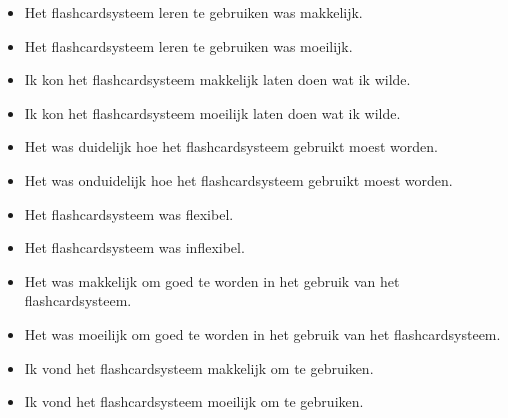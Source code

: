 \begin{itemize}
\itemsep1pt\parskip0pt
\item
  Het flashcardsysteem leren te gebruiken was makkelijk.
\item
  Het flashcardsysteem leren te gebruiken was moeilijk.
\item
  Ik kon het flashcardsysteem makkelijk laten doen wat ik wilde.
\item
  Ik kon het flashcardsysteem moeilijk laten doen wat ik wilde.
\item
  Het was duidelijk hoe het flashcardsysteem gebruikt moest worden.
\item
  Het was onduidelijk hoe het flashcardsysteem gebruikt moest worden.
\item
  Het flashcardsysteem was flexibel.
\item
  Het flashcardsysteem was inflexibel.
\item
  Het was makkelijk om goed te worden in het gebruik van het
  flashcardsysteem.
\item
  Het was moeilijk om goed te worden in het gebruik van het
  flashcardsysteem.
\item
  Ik vond het flashcardsysteem makkelijk om te gebruiken.
\item
  Ik vond het flashcardsysteem moeilijk om te gebruiken.
\end{itemize}
